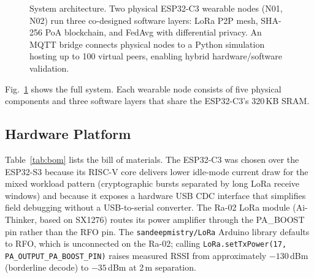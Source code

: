 \documentclass[journal]{IEEEtran}
\begin{document}
\begin{figure}[t]
{%
}%
\caption{System architecture. Two physical ESP32-C3 wearable nodes (N01,
N02) run three co-designed software layers: LoRa P2P mesh, SHA-256 PoA
blockchain, and FedAvg with differential privacy. An MQTT bridge connects
physical nodes to a Python simulation hosting up to 100 virtual peers,
enabling hybrid hardware/software validation.}
\label{fig:arch}
\end{figure}

Fig.~\ref{fig:arch} shows the full system. Each wearable node consists of
five physical components and three software layers that share the
ESP32-C3's 320\,KB SRAM.

\subsection{Hardware Platform}

Table~\ref{tab:bom} lists the bill of materials. The ESP32-C3 was chosen
over the ESP32-S3 because its RISC-V core delivers lower idle-mode current
draw for the mixed workload pattern (cryptographic bursts separated by
long LoRa receive windows) and because it exposes a hardware USB CDC
interface that simplifies field debugging without a USB-to-serial
converter. The Ra-02 LoRa module (Ai-Thinker, based on SX1276) routes its
power amplifier through the PA\_BOOST pin rather than the RFO pin. The
\texttt{sandeepmistry/LoRa} Arduino library defaults to RFO, which is
unconnected on the Ra-02; calling
\texttt{LoRa.setTxPower(17,\,PA\_OUTPUT\_PA\_BOOST\_PIN)} raises measured
RSSI from approximately $-130$\,dBm (borderline decode) to $-35$\,dBm at
2\,m separation.
\end{document}
